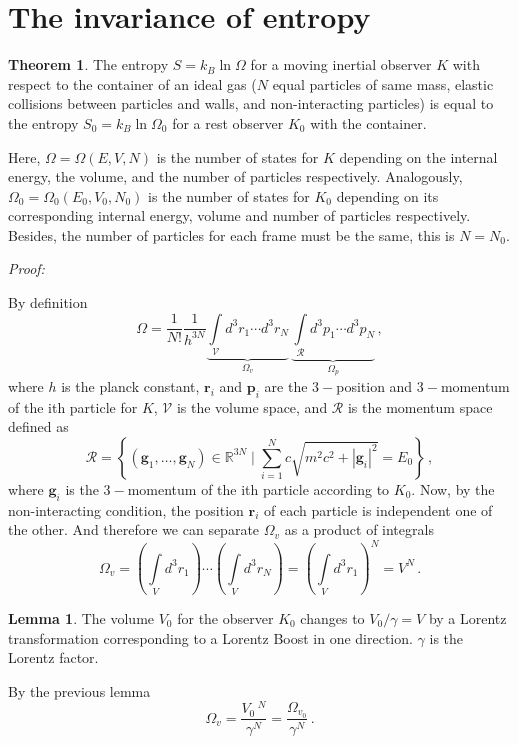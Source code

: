 \documentclass[11pt]{article}
\theoremstyle{definition}     %
\newtheorem{theorem}{Theorem} %
\theoremstyle{definition}     %
\newtheorem{lemma}{Lemma}     %
\def\be{\begin{equation}}
\def\ee{\end{equation}}
\def\Re{\mathbb{R}}
\begin{document}
\section{The invariance of entropy}
\begin{theorem}
The entropy $S=k_B\ln\Omega$ for a moving inertial observer $K$ with respect to the container of an ideal gas ($N$ equal particles of same mass, elastic collisions between particles and walls, and non-interacting particles) is equal to the entropy $S_0=k_B\ln\Omega_0$ for a rest observer $K_0$ with the container. 

Here, $\Omega=\Omega(E,V,N)$ is the number of states for $K$ depending on the internal energy, the volume, and the number of particles respectively. Analogously, $\Omega_0=\Omega_0(E_0,V_0,N_0)$ is the number of states for $K_0$ depending on its corresponding internal energy, volume and number of particles respectively. Besides, the number of particles for each frame must be the same, this is $N=N_0$.
\end{theorem}

\textit{Proof:}

By definition
\be 
\Omega=\frac{1}{N!}\frac{1}{h^{3N}}\underbrace{\int\limits_\mathscr{V} d^3r_1\cdots d^3r_N}_{\Omega_v}\,\underbrace{\int\limits_\mathcal{R} d^3p_1 \cdots d^3 p_N}_{\Omega_p}\,,
\ee
where $h$ is the planck constant, $\mathbf{r}_i$ and $\mathbf{p}_i$ are the $3-$position and $3-$momentum of the ith particle for $K$, $\mathscr{V}$ is the volume space, and $\mathcal{R}$ is the momentum space defined as
\be 
\mathcal{R} = \left\{ (\mathbf{g}_1,\dots,\mathbf{g}_N)\in\Re^{3N} \mid \sum\limits_{i=1}^{N} c\sqrt{m^2c^2+|\mathbf{g}_i|^2} = E_0 \right\} \,, \label{eq:R}
\ee
where $\mathbf{g}_i$ is the $3-$momentum of the ith particle according to $K_0$. Now, by the non-interacting condition, the position $\mathbf{r}_i$ of each particle is independent one of the other. And therefore we can separate $\Omega_v$ as a product of integrals
\be 
	\Omega_v = \left(\int\limits_V d^3 r_1\right)\cdots \left(\int\limits_V d^3 r_N\right) = \left(\int\limits_V d^3 r_1\right)^N = V^N\,.
\ee

\begin{lemma}
The volume $V_0$ for the observer $K_0$ changes to $V_0/\gamma=V$ by a Lorentz transformation corresponding to a Lorentz Boost in one direction. $\gamma$ is the Lorentz factor.
\end{lemma}

By the previous lemma 
\be 
\Omega_v = \frac{V_0\,^N}{\gamma^N} = \frac{\Omega_{v_0}}{\gamma^N}\,. \label{eq:omega_v}
\ee
\end{document}
